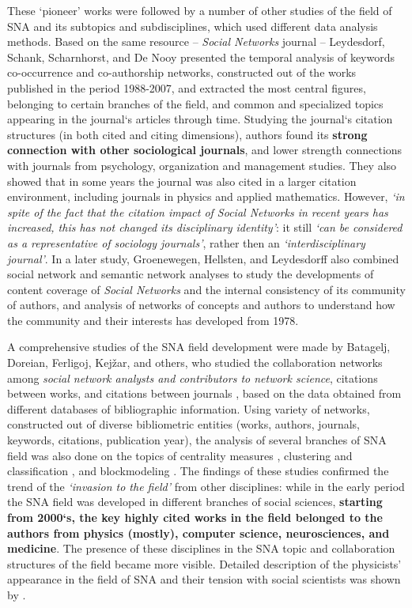 \documentclass[11pt]{article} %
\begin{document}
These `pioneer' works were followed by a number of other studies of the field of SNA and its subtopics and subdisciplines, which used different data analysis methods. Based on the same resource -- \textit{Social Networks} journal -- Leydesdorf, Schank, Scharnhorst, and De Nooy \citeyearpar{leydes} presented the temporal analysis of keywords co-occurrence and co-authorship networks, constructed out of the works published in the period 1988-2007, and extracted the most central figures, belonging to certain branches of the field, and common and specialized topics appearing in the journal`s articles through time. Studying the journal`s citation structures (in both cited and citing dimensions),  authors found its \textbf{strong connection with other sociological journals}, and lower strength connections with journals from psychology, organization and management studies. They also showed that in some years the journal was also cited in a larger citation environment, including journals in physics and applied mathematics. However, \textit{`in spite of the fact that the citation impact of Social Networks in recent years has increased, this has not changed its disciplinary identity'}: it still \textit{`can be considered as a representative of sociology journals'}, rather then an \textit{`interdisciplinary journal'}. In a later study,  Groenewegen, Hellsten, and Leydesdorff \citeyearpar{lookingglass} also combined social network and semantic network analyses to study the developments of content coverage of \textit{Social Networks} and the internal consistency of its community of authors, and analysis of networks of concepts and authors to understand how the community and their interests has developed from 1978.   \medskip 

A comprehensive studies of the SNA field development were made by Batagelj, Doreian, Ferligoj, Kejžar, and others, who studied the collaboration networks among \textit{social network analysts and contributors to network science}, citations between works, and citations between journals \citep{Understand}, based on the data obtained from different databases of bibliographic information. Using variety of networks, constructed out of diverse bibliometric entities (works, authors, journals, keywords, citations, publication year), the analysis of several branches of SNA field was also done on the topics of centrality measures \citep{Understand}, clustering and classification \citep{kejzar}, and blockmodeling \citep{batagelj2019}. The findings of these studies confirmed the trend of the \textit{`invasion to the field'} from other disciplines: while in the early period the SNA field was developed in different branches of social sciences, \textbf{starting from 2000`s, the key highly cited works in the field belonged to the authors from physics (mostly), computer science, neurosciences, and medicine}. The presence of these disciplines in the SNA topic and collaboration structures of the field became more visible. Detailed description of the physicists' appearance in the field of SNA and their tension with social scientists was shown by \cite{SNAdev2}.\medskip  
\end{document}
